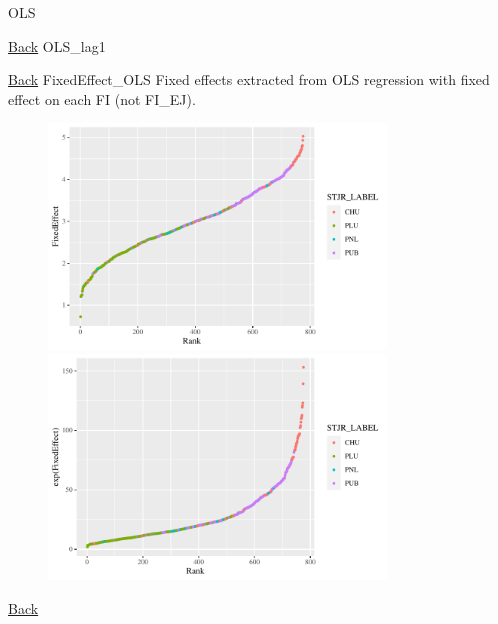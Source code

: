 \newpage
\hypertarget{reg_inf_ols_2022}{OLS}

\hyperlink{home}{Back}
\bigskip
\newpage
\hypertarget{reg_inf_lag_2022}{OLS\_lag1}

\hyperlink{home}{Back}
\bigskip
\newpage
\hypertarget{FE_OLS_FI}{FixedEffect\_OLS} Fixed effects extracted from OLS regression with fixed effect on each FI (not FI\_EJ).
\begin{figure}[!htbp]
    \centering
    \includegraphics[width=0.8\textwidth]{../../Figures/2016-2022/FE_ols_FI.pdf}
    \includegraphics[width=0.8\textwidth]{../../Figures/2016-2022/FE_ols_FI_e.pdf}
\end{figure}
\hyperlink{home}{Back}
\bigskip